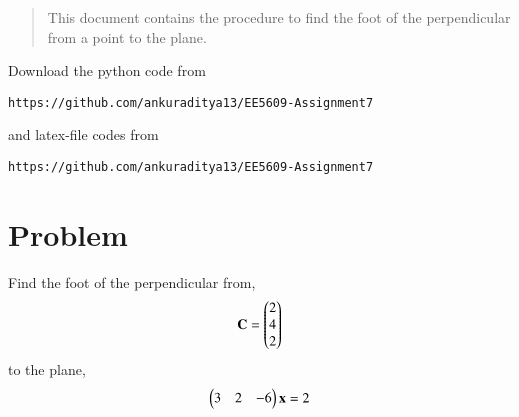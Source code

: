 \documentclass[journal,12pt,twocolumn]{IEEEtran}
\begin{document}
\begin{abstract}
This document contains the procedure to find the foot of the perpendicular from a point to the plane.
\end{abstract}
Download the python code from 
\begin{lstlisting}
https://github.com/ankuraditya13/EE5609-Assignment7
\end{lstlisting}
%
and latex-file codes from 
%
\begin{lstlisting}
https://github.com/ankuraditya13/EE5609-Assignment7
\end{lstlisting}

\section{Problem}
Find the foot of the perpendicular from,
\begin{align}
\mathbf{C} = \begin{pmatrix}2\\4\\2\end{pmatrix}
\end{align} 
to the plane,
\begin{align}
\begin{pmatrix}3&2&-6\end{pmatrix}\mathbf{x} = 2
\label{Q}
\end{align}
\end{document}
